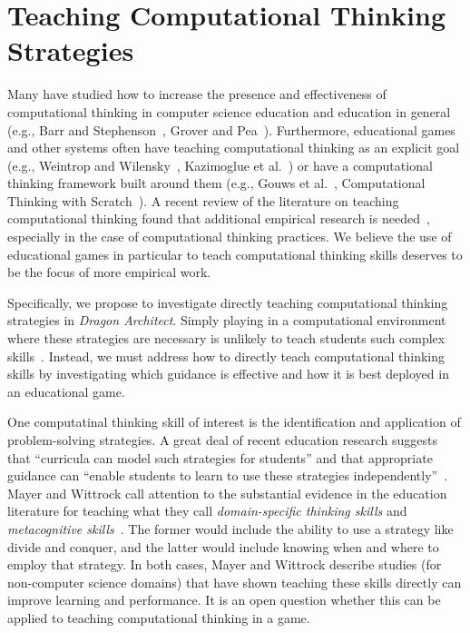 \documentclass{sig-alternate}
\begin{document}
\section{Teaching Computational Thinking Strategies}

Many have studied how to increase the presence and effectiveness of computational thinking in computer science education and education in general (e.g., Barr and Stephenson~\cite{barr2011bringing}, Grover and Pea~\cite{grover2013computational}). 
Furthermore, educational games and other systems often have teaching computational thinking as an explicit goal (e.g., Weintrop and Wilensky~\cite{weintrop2013robobuilder},  Kazimoglue et al.~\cite{kazimoglu2012serious}) or have a computational thinking framework built around them (e.g., Gouws et al.~\cite{gouws2013lightbot}, Computational Thinking with Scratch~\cite{scratchedCT}).
A recent review of the literature on teaching computational thinking found that additional empirical research is needed~\cite{lye2014review}, especially in the case of computational thinking practices.
We believe the use of educational games in particular to teach computational thinking skills deserves to be the focus of more empirical work. 

Specifically, we propose to investigate directly teaching computational thinking strategies in \emph{Dragon Architect}. 
Simply playing in a computational environment where these strategies are necessary is unlikely to teach students such complex skills~\cite{mayer2004should}.
Instead, we must address how to directly teach computational thinking skills by investigating which guidance is effective and how it is best deployed in an educational game.

One computatinal thinking skill of interest is the identification and application of problem-solving strategies.
A great deal of recent education research suggests that ``curricula can model such strategies for students'' and that appropriate guidance can ``enable students to learn to use these strategies independently''~\cite{report2010computational}.
Mayer and Wittrock call attention to the substantial evidence in the education literature for teaching what they call \emph{domain-specific thinking skills} and \emph{metacognitive skills}~\cite{mayer1996handbook}.
The former would include the ability to use a strategy like divide and conquer, and the latter would include knowing when and where to employ that strategy.
In both cases, Mayer and Wittrock describe studies (for non-computer science domains) that have shown teaching these skills directly can improve learning and performance. 
It is an open question whether this can be applied to teaching computational thinking in a game.
\end{document}
